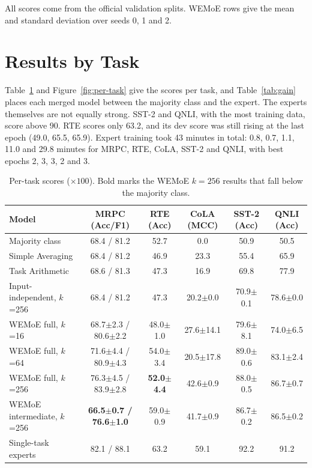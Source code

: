 All scores come from the official validation splits. WEMoE rows give the mean and standard deviation over seeds 0, 1 and 2.

\section{Results by Task}

Table~\ref{tab:per-task} and Figure~\ref{fig:per-task} give the scores per task, and Table~\ref{tab:gain} places each merged model between the majority class and the expert. The experts themselves are not equally strong. SST-2 and QNLI, with the most training data, score above 90. RTE scores only 63.2, and its dev score was still rising at the last epoch (49.0, 65.5, 65.9). Expert training took 43 minutes in total: 0.8, 0.7, 1.1, 11.0 and 29.8 minutes for MRPC, RTE, CoLA, SST-2 and QNLI, with best epochs 2, 3, 3, 2 and 3.

\begin{table}[htbp]
  \centering\tablestyle
  \caption{Per-task scores ($\times100$). Bold marks the WEMoE $k=256$ results that fall below the majority class.}
  \label{tab:per-task}
  \setlength{\tabcolsep}{3pt}\begin{tabular}{l c c c c c}
    \toprule
    Model & MRPC (Acc/F1) & RTE (Acc) & CoLA (MCC) & SST-2 (Acc) & QNLI (Acc)\\
    \midrule
    Majority class & 68.4 / 81.2 & 52.7 & 0.0 & 50.9 & 50.5\\
    Simple Averaging & 68.4 / 81.2 & 46.9 & 23.3 & 55.4 & 65.9\\
    Task Arithmetic & 68.6 / 81.3 & 47.3 & 16.9 & 69.8 & 77.9\\
    Input-independent, $k$=256 & 68.4 / 81.2 & 47.3 & 20.2$\pm$0.0 & 70.9$\pm$0.1 & 78.6$\pm$0.0\\
    WEMoE full, $k$=16 & 68.7$\pm$2.3 / 80.6$\pm$2.2 & 48.0$\pm$1.0 & 27.6$\pm$14.1 & 79.6$\pm$8.1 & 74.0$\pm$6.5\\
    WEMoE full, $k$=64 & 71.6$\pm$4.4 / 80.9$\pm$4.3 & 54.0$\pm$3.4 & 20.5$\pm$17.8 & 89.0$\pm$0.6 & 83.1$\pm$2.4\\
    WEMoE full, $k$=256 & 76.3$\pm$4.5 / 83.9$\pm$2.8 & \textbf{52.0$\pm$4.4} & 42.6$\pm$0.9 & 88.0$\pm$0.5 & 86.7$\pm$0.7\\
    WEMoE intermediate, $k$=256 & \textbf{66.5$\pm$0.7 / 76.6$\pm$1.0} & 59.0$\pm$0.9 & 41.7$\pm$0.9 & 86.7$\pm$0.2 & 86.5$\pm$0.2\\
    Single-task experts & 82.1 / 88.1 & 63.2 & 59.1 & 92.2 & 91.2\\
    \bottomrule
  \end{tabular}
\end{table}

